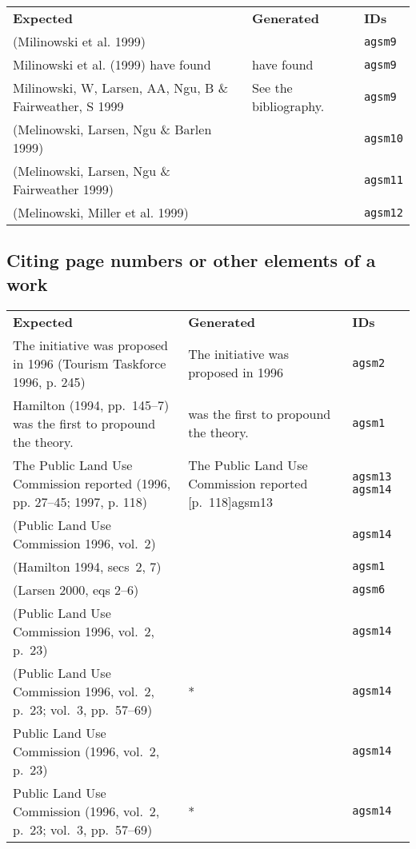 \documentclass[a4paper,landscape,12pt]{article}
\newlength\q
\newlength\qr
\newenvironment{citetable}
  {\noindent\begin{longtable}{p{\q} p{\q} p{\qr}}\textbf{Expected} & \textbf{Generated} & \textbf{IDs}\\}
  {\end{longtable}}
\newcommand{\trivialissue}[1]{#1 *}
\begin{document}
\begin{citetable}
	(Milinowski et al. 1999) & \parencite{agsm9} & \texttt{agsm9} \\
	Milinowski et al. (1999) have found & \textcite{agsm9} have found & \texttt{agsm9} \\
	Milinowski, W, Larsen, AA, Ngu, B \& Fairweather, S 1999 & See the bibliography. & \texttt{agsm9} \\
	(Melinowski, Larsen, Ngu \& Barlen 1999) & \parencite{agsm10} & \texttt{agsm10} \\
	(Melinowski, Larsen, Ngu \& Fairweather 1999) & \parencite{agsm11} & \texttt{agsm11} \\
	(Melinowski, Miller et al. 1999) & \parencite{agsm12} & \texttt{agsm12} \\
\end{citetable}

\subsection{Citing page numbers or other elements of a work}

\begin{citetable}
	The initiative was proposed in 1996 (Tourism Taskforce 1996, p. 245) & The initiative was proposed in 1996 \parencite[p.~245]{agsm2} & \texttt{agsm2} \\
	Hamilton (1994, pp.~145--7) was the first to propound the theory. & \textcite[pp.~145--7]{agsm1} was the first to propound the theory. & \texttt{agsm1} \\
	The Public Land Use Commission reported \textellipsis (1996, pp. 27--45; 1997, p. 118) & The Public Land Use Commission reported \textellipsis \parenciteyears[pp.~27--45]{agsm14}[p.~118]{agsm13} & \texttt{agsm13} \texttt{agsm14} \\
	(Public Land Use Commission 1996, vol.~2) & \parencite[vol.~2]{agsm14} & \texttt{agsm14} \\
	(Hamilton 1994, secs~2, 7) & \parencite[secs~2,~7]{agsm1} & \texttt{agsm1} \\
	(Larsen 2000, eqs 2--6) & \parencite[eqs~2--6]{agsm6} & \texttt{agsm6} \\
	(Public Land Use Commission 1996, vol.~2, p.~23) & \parencite[vol.~2, p.~23]{agsm14} & \texttt{agsm14} \\
	(Public Land Use Commission 1996, vol.~2, p.~23; vol.~3, pp.~57--69) & \trivialissue{\parencite[vol.~2, p.~23; vol.~3, pp.~57--69]{agsm14}} & \texttt{agsm14} \\
	Public Land Use Commission (1996, vol.~2, p.~23) & \textcite[vol.~2,~p.~23]{agsm14} & \texttt{agsm14} \\
	Public Land Use Commission (1996, vol.~2, p.~23; vol.~3, pp.~57--69) & \trivialissue{\textcite[vol.~2, p.~23; vol.~3, pp.~57--69]{agsm14}} & \texttt{agsm14} \\
\end{citetable}
\end{document}
